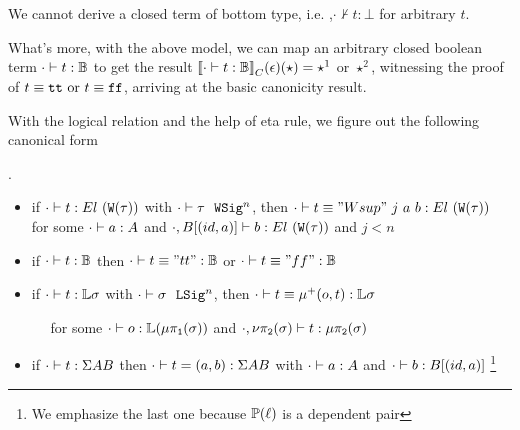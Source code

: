 \begin{theorem}[Consistency]
  We cannot derive a closed term of bottom type, i.e. ,$\cdot \not \vdash t : \bot$ for arbitrary $t$.
\end{theorem}

What's more, with the above model, we can map an arbitrary closed boolean term $ {\cdot} \vdash {t} : {\mathbb{B}} $ to get the result ${\llbracket {\ensuremath{ {\cdot} \vdash {t} : {\mathbb{B}} }} \rrbracket}_C(\epsilon)(\star) = \star^1$ or $\star^2$, witnessing the proof of $t \equiv \texttt{tt} \text{ or } t \equiv\texttt{ff}$, arriving at the basic canonicity result.


With the logical relation and the help of eta rule, we figure out the following canonical form
\begin{theorem}.
  \begin{itemize}
    \item if $ {\cdot} \vdash {t} : {El~(\texttt{W}({\tau}))} $ with $ {\cdot} \vdash {\tau} \ \ \texttt{WSig}^{n} $, then $ {\cdot} \vdash {t \equiv "Wsup"~j~a~b} : {El~(\texttt{W}({\tau}))} $ for some $ {\cdot} \vdash {a} : {A} $ and $ {\cdot, B[(id, a)]} \vdash {b} : {El~(\texttt{W}({\tau}))} $ and $j < n$
    \item if $ {\cdot} \vdash {t} : {\mathbb{B}} $ then $ {\cdot} \vdash {t \equiv "tt"} : {\mathbb{B}} $ or $ {\cdot} \vdash {t \equiv "ff"} : {\mathbb{B}} $ 
    \item if $ {\cdot} \vdash {t} : {\mathbb{L}\sigma} $ with $ {\cdot} \vdash {\sigma} \ \ \texttt{LSig}^{n} $, then $ {\cdot} \vdash {t \equiv \ensuremath{\mu^+({o},{t})}} : {\mathbb{L}\sigma} $ 
    
      $\quad$ for some $ {\cdot} \vdash {o} : {\mathbb{L}(\mu\pi_{\texttt{1}}({\sigma}))} $ and $ {\cdot, \nu\pi_{\texttt{2}}({\sigma})} \vdash {t} : {\mu\pi_{\texttt{2}}({\sigma})} $
    \item if $ {\cdot} \vdash {t} : {\Sigma A B} $ then $ {\cdot} \vdash {t = (a, b)} : {\Sigma A B} $ with $ {\cdot} \vdash {a} : {A} $ and $ {\cdot} \vdash {b} : {B[(id, a)]} $
    \footnote{We emphasize the last one because $\mathbb{P}({\ell})$ is a dependent pair}
  \end{itemize}
\end{theorem}

